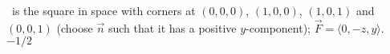 {\surfaceS\ is the square in space with corners at $(0,0,0)$, $(1,0,0)$, $(1,0,1)$ and $(0,0,1)$ (choose $\vec n$ such that it has a positive $y$-component); $\vec F = \langle 0,-z,y\rangle$.
}
{$-1/2$
}
